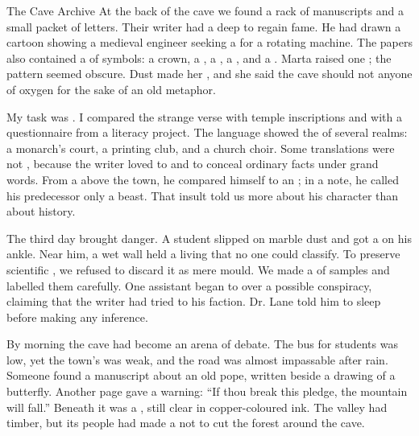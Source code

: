 \documentclass[12pt]{nextbook}
\begin{document}
\begin{readersection}{The Cave Archive}
At the back of the cave we found a rack of manuscripts and a small packet of letters. Their writer had a deep  to regain fame. He had drawn a cartoon showing a medieval engineer seeking a  for a rotating machine. The papers also contained a   of symbols: a crown, a , a , a , and a . Marta raised one ; the pattern seemed obscure. Dust made her , and she said the cave should not  anyone of oxygen for the sake of an old metaphor.

My task was . I compared the strange verse with temple inscriptions and with a questionnaire from a literacy project. The language showed the  of several realms: a monarch’s court, a  printing club, and a church choir. Some translations were not , because the writer loved to  and to conceal ordinary facts under grand words. From a  above the town, he compared himself to an ; in a  note, he called his predecessor only a beast. That insult told us more about his character than about history.

The third day brought danger. A student slipped on marble dust and got a  on his ankle. Near him, a wet wall held a living  that no one could classify. To preserve scientific , we refused to discard it as mere mould. We made a  of samples and labelled them carefully. One assistant began to  over a possible conspiracy, claiming that the writer had tried to  his faction. Dr. Lane told him to sleep  before making any inference.

By morning the cave had become an arena of debate. The bus  for students was low, yet the town’s  was weak, and the road was almost impassable after rain. Someone found a manuscript about an old pope, written beside a drawing of a butterfly. Another page gave a  warning: “If thou break this pledge, the mountain will fall.” Beneath it was a , still clear in copper-coloured ink. The valley had  timber, but its people had made a  not to cut the forest around the cave.


\end{readersection}
\end{document}
